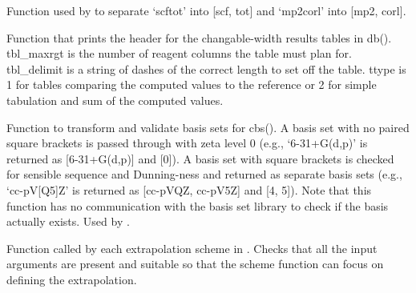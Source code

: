 \documentclass[letterpaper,10pt,english]{sphinxmanual}
\begin{document}

\begin{fulllineitems}
\label{index:wrappers.split_menial}
Function used by {\hyperref[index:wrappers.complete_basis_set]{}} to separate `scftot'
into {[}scf, tot{]} and `mp2corl' into {[}mp2, corl{]}.

\end{fulllineitems}


\begin{fulllineitems}
\label{index:wrappers.tblhead}
Function that prints the header for the changable-width results tables in db().
tbl\_maxrgt is the number of reagent columns the table must plan for. tbl\_delimit
is a string of dashes of the correct length to set off the table. ttype is 1 for
tables comparing the computed values to the reference or 2 for simple tabulation
and sum of the computed values.

\end{fulllineitems}


\begin{fulllineitems}
\label{index:wrappers.validate_bracketed_basis}
Function to transform and validate basis sets for cbs(). A basis set with no 
paired square brackets is passed through with zeta level 0 (e.g., `6-31+G(d,p)'
is returned as {[}6-31+G(d,p){]} and {[}0{]}). A basis set with square brackets is 
checked for sensible sequence and Dunning-ness and returned as separate basis
sets (e.g., `cc-pV{[}Q5{]}Z' is returned as {[}cc-pVQZ, cc-pV5Z{]} and {[}4, 5{]}). Note
that this function has no communication with the basis set library to check
if the basis actually exists. Used by {\hyperref[index:wrappers.complete_basis_set]{}}.

\end{fulllineitems}


\begin{fulllineitems}
\label{index:wrappers.validate_scheme_args}
Function called by each extrapolation scheme in {\hyperref[index:wrappers.complete_basis_set]{}}.
Checks that all the input arguments are present and suitable so that
the scheme function can focus on defining the extrapolation.

\end{fulllineitems}
\end{document}
